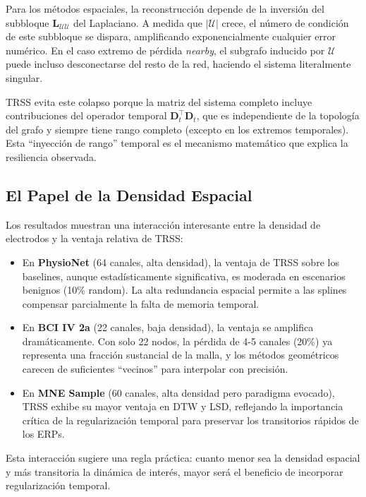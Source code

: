 Para los métodos espaciales, la reconstrucción depende de la inversión del subbloque $\mathbf{L}_{\mathcal{U}\mathcal{U}}$ del Laplaciano. A medida que $|\mathcal{U}|$ crece, el número de condición de este subbloque se dispara, amplificando exponencialmente cualquier error numérico. En el caso extremo de pérdida \textit{nearby}, el subgrafo inducido por $\mathcal{U}$ puede incluso desconectarse del resto de la red, haciendo el sistema literalmente singular.

TRSS evita este colapso porque la matriz del sistema completo incluye contribuciones del operador temporal $\mathbf{D}_t^\top \mathbf{D}_t$, que es independiente de la topología del grafo y siempre tiene rango completo (excepto en los extremos temporales). Esta ``inyección de rango'' temporal es el mecanismo matemático que explica la resiliencia observada.

\subsection{El Papel de la Densidad Espacial}

Los resultados muestran una interacción interesante entre la densidad de electrodos y la ventaja relativa de TRSS:
\begin{itemize}
    \item En \textbf{PhysioNet} (64 canales, alta densidad), la ventaja de TRSS sobre los baselines, aunque estadísticamente significativa, es moderada en escenarios benignos (10\% random). La alta redundancia espacial permite a las splines compensar parcialmente la falta de memoria temporal.
    \item En \textbf{BCI IV 2a} (22 canales, baja densidad), la ventaja se amplifica dramáticamente. Con solo 22 nodos, la pérdida de 4-5 canales (20\%) ya representa una fracción sustancial de la malla, y los métodos geométricos carecen de suficientes ``vecinos'' para interpolar con precisión.
    \item En \textbf{MNE Sample} (60 canales, alta densidad pero paradigma evocado), TRSS exhibe su mayor ventaja en DTW y LSD, reflejando la importancia crítica de la regularización temporal para preservar los transitorios rápidos de los ERPs.
\end{itemize}

Esta interacción sugiere una regla práctica: cuanto menor sea la densidad espacial y más transitoria la dinámica de interés, mayor será el beneficio de incorporar regularización temporal.

